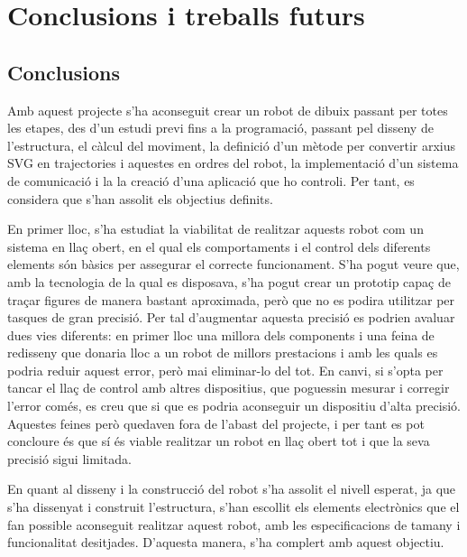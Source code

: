 \setlength\topmargin{8mm}
\onehalfspacing
\chapter{Conclusions i treballs futurs} %

\label{Chapter8} %




\section{Conclusions}

Amb aquest projecte s'ha aconseguit crear un robot de dibuix passant per totes les etapes, des d'un estudi previ fins a la programació, passant pel disseny de l'estructura, el càlcul del moviment, la definició d'un mètode per convertir arxius SVG en trajectories i aquestes en ordres del robot, la implementació d'un sistema de comunicació i la la creació d'una aplicació que ho controli. Per tant, es considera que s'han assolit els objectius definits.

En primer lloc, s'ha estudiat la viabilitat de realitzar aquests robot com un sistema en llaç obert, en el qual els comportaments i el control dels diferents elements són bàsics per assegurar el correcte funcionament. S'ha pogut veure que, amb la tecnologia de la qual es disposava, s'ha pogut crear un prototip capaç de traçar figures de manera bastant aproximada, però que no es podira utilitzar per tasques de gran precisió. Per tal d'augmentar aquesta precisió es podrien avaluar dues vies diferents: en primer lloc una millora dels components i una feina de redisseny que donaria lloc a un robot de millors prestacions i amb les quals es podria reduir aquest error, però mai eliminar-lo del tot. En canvi, si s'opta per tancar el llaç de control amb altres dispositius, que poguessin mesurar i corregir l'error comés, es creu que si que es podria aconseguir un dispositiu d'alta precisió. Aquestes feines però quedaven fora de l'abast del projecte, i per tant es pot concloure és que sí és viable realitzar un robot en llaç obert tot i que la seva precisió sigui limitada. 

En quant al disseny i la construcció del robot s'ha assolit el nivell esperat, ja que s'ha dissenyat i construit l'estructura, s'han escollit els elements electrònics que el fan possible aconseguit realitzar aquest robot, amb les especificacions de tamany i funcionalitat desitjades. D'aquesta manera, s'ha complert amb aquest objectiu.


